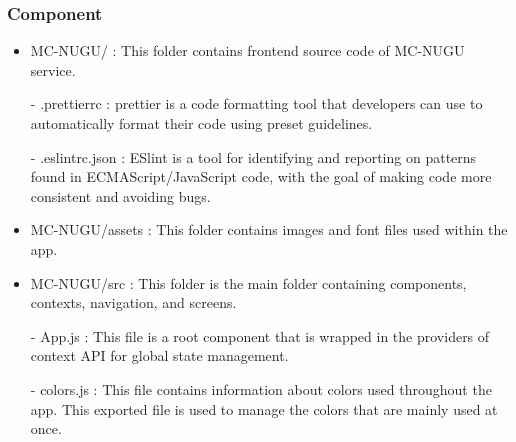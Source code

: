\documentclass[conference]{IEEEtran}
\begin{document}
        \subsubsection{Component}
            \begin{itemize}
                \item MC-NUGU/ : This folder contains frontend source code of MC-NUGU service.
                    \item[-] .prettierrc : prettier is a code formatting tool that developers can use to automatically format their code using preset guidelines. 
                    \item[-] .eslintrc.json : ESlint is a tool for identifying and reporting on patterns found in ECMAScript/JavaScript code, with the goal of making code more consistent and avoiding bugs.
                \vspace{3mm}
                
                \item MC-NUGU/assets : This folder contains images and font files used within the app.
                \vspace{3mm}
                
                \item MC-NUGU/src : This folder is the main folder containing components, contexts, navigation, and screens.
                    \item[-] App.js : This file is a root component that is wrapped in the providers of context API for global state management.
                    \item[-] colors.js : This file contains information about colors used throughout the app. This exported file is used to manage the colors that are mainly used at once. 
                \vspace{3mm}
                

\end{itemize}
\end{document}
